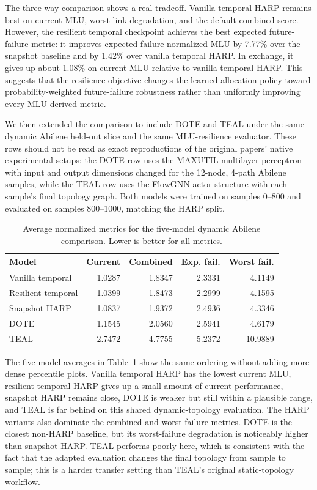 \documentclass[letterpaper,twocolumn,10pt]{article}
\begin{document}
The three-way comparison shows a real tradeoff. Vanilla temporal HARP remains best on current MLU, worst-link degradation, and the default combined score. However, the resilient temporal checkpoint achieves the best expected future-failure metric: it improves expected-failure normalized MLU by 7.77\% over the snapshot baseline and by 1.42\% over vanilla temporal HARP. In exchange, it gives up about 1.08\% on current MLU relative to vanilla temporal HARP. This suggests that the resilience objective changes the learned allocation policy toward probability-weighted future-failure robustness rather than uniformly improving every MLU-derived metric.

We then extended the comparison to include DOTE and TEAL under the same dynamic Abilene held-out slice and the same MLU-resilience evaluator. These rows should not be read as exact reproductions of the original papers' native experimental setups: the DOTE row uses the MAXUTIL multilayer perceptron with input and output dimensions changed for the 12-node, 4-path Abilene samples, while the TEAL row uses the FlowGNN actor structure with each sample's final topology graph. Both models were trained on samples 0--800 and evaluated on samples 800--1000, matching the HARP split.

\begin{table}[t]
\centering
\begin{tabular}{lrrrr}
\hline
Model & Current & Combined & Exp. fail. & Worst fail. \\
\hline
Vanilla temporal & 1.0287 & 1.8347 & 2.3331 & 4.1149 \\
Resilient temporal & 1.0399 & 1.8473 & 2.2999 & 4.1595 \\
Snapshot HARP & 1.0837 & 1.9372 & 2.4936 & 4.3346 \\
DOTE & 1.1545 & 2.0560 & 2.5941 & 4.6179 \\
TEAL & 2.7472 & 4.7755 & 5.2372 & 10.9889 \\
\hline
\end{tabular}
\caption{Average normalized metrics for the five-model dynamic Abilene comparison. Lower is better for all metrics.}
\label{tab:all-five-resilience}
\end{table}

The five-model averages in Table~\ref{tab:all-five-resilience} show the same ordering without adding more dense percentile plots. Vanilla temporal HARP has the lowest current MLU, resilient temporal HARP gives up a small amount of current performance, snapshot HARP remains close, DOTE is weaker but still within a plausible range, and TEAL is far behind on this shared dynamic-topology evaluation. The HARP variants also dominate the combined and worst-failure metrics. DOTE is the closest non-HARP baseline, but its worst-failure degradation is noticeably higher than snapshot HARP. TEAL performs poorly here, which is consistent with the fact that the adapted evaluation changes the final topology from sample to sample; this is a harder transfer setting than TEAL's original static-topology workflow.
\end{document}
